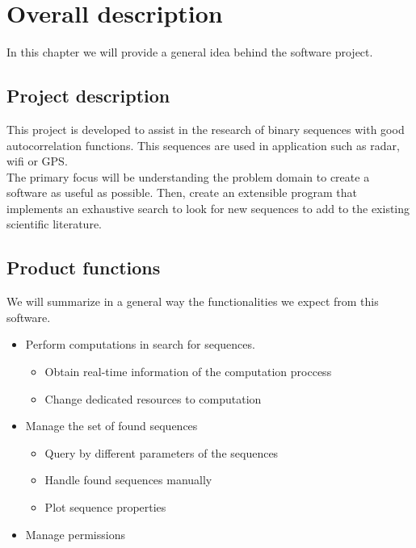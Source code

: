 \section{Overall description}

  In this chapter we will provide a general idea behind the software project.
  \subsection{Project description}

  This project is developed to assist in the research of binary sequences with
  good autocorrelation functions. This sequences are used in application such
  as radar, wifi or GPS.\\

  The primary focus will be understanding the problem domain to create a
  software as useful as possible. Then, create an extensible program that
  implements an exhaustive search to look for new sequences to add to the
  existing scientific literature.\\

  \subsection{Product functions}

  We will summarize in a general way the functionalities we expect from
  this software.

  \begin{itemize}
    \item Perform computations in search for sequences.\\
            \begin{itemize}
              \item Obtain real-time information of the computation proccess
              \item Change dedicated resources to computation
            \end{itemize}
    \item Manage the set of found sequences
            \begin{itemize}
              \item Query by different parameters of the sequences
              \item Handle found sequences manually
              \item Plot sequence properties
            \end{itemize}
    \item Manage permissions
  \end{itemize}

